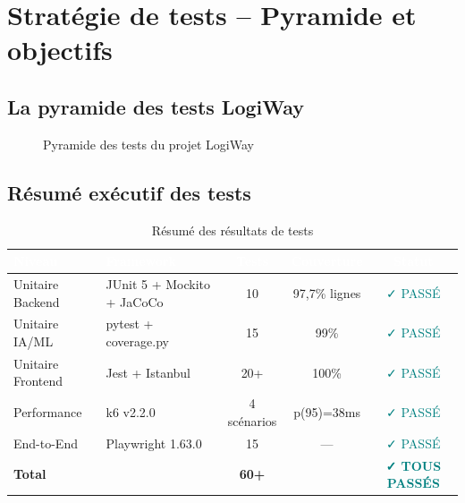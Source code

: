 \documentclass[12pt,a4paper]{report}
\newcommand{\thead}[1]{\cellcolor{tablehead}\textcolor{white}{\textbf{#1}}}
\begin{document}
\section{Stratégie de tests -- Pyramide et objectifs}
\label{sec:ch8-strategie}

\subsection{La pyramide des tests LogiWay}

\begin{figure}[H]
\centering
{}
\caption{Pyramide des tests du projet LogiWay}
\label{fig:pyramide_tests}
\end{figure}

\subsection{Résumé exécutif des tests}

\begin{table}[H]
  \centering
  \caption{Résumé des résultats de tests}
  \label{tab:resume_tests}
  \begin{tabularx}{\textwidth}{|l|l|c|c|c|}
    \hline
    \thead{Niveau} & \thead{Framework} & \thead{Tests} & \thead{Couverture} & \thead{Statut} \\
    \hline
    Unitaire Backend & JUnit 5 + Mockito + JaCoCo & 10 & 97,7\% lignes & \textcolor{teal}{✓ PASSÉ} \\
    Unitaire IA/ML & pytest + coverage.py & 15 & 99\% & \textcolor{teal}{✓ PASSÉ} \\
    Unitaire Frontend & Jest + Istanbul & 20+ & 100\% & \textcolor{teal}{✓ PASSÉ} \\
    Performance & k6 v2.2.0 & 4 scénarios & p(95)=38ms & \textcolor{teal}{✓ PASSÉ} \\
    End-to-End & Playwright 1.63.0 & 15 & --- & \textcolor{teal}{✓ PASSÉ} \\
    \hline
    \multicolumn{2}{|l|}{\textbf{Total}} & \textbf{60+} & & \textcolor{teal}{\textbf{✓ TOUS PASSÉS}} \\
    \hline
  \end{tabularx}
\end{table}
\end{document}
